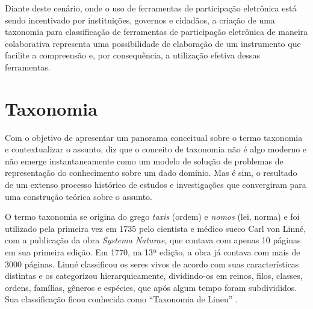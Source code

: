 \par
Diante deste cenário, onde o uso de ferramentas de participação eletrônica está sendo incentivado por instituições, governos e cidadãos, a criação de uma taxonomia para 
classificação de ferramentas de participação eletrônica de maneira colaborativa representa uma possibilidade de elaboração de um instrumento que facilite a compreensão e, 
por consequência, a utilização efetiva dessas ferramentas. 


\section{Taxonomia}
\label{sec:taxonomia}
Com o objetivo de apresentar um panorama conceitual sobre o termo taxonomia e contextualizar o assunto,  diz que o conceito de taxonomia
não é algo moderno e não emerge instantaneamente como um modelo de solução de problemas de representação do conhecimento sobre um dado domínio. Mas é sim,
o resultado de um extenso processo histórico de estudos e investigações que convergiram para uma construção teórica sobre o assunto. 

\par
O termo taxonomia se origina do grego \textit{taxis} (ordem) e \textit{nomos} (lei, norma) e foi utilizado pela primeira vez em 1735 pelo cientista e médico sueco Carl von Linné,
com a publicação da obra \textit{Systema Naturae}, que contava com apenas 10 páginas em sua primeira edição. Em 1770, na 13ª edição, a obra já contava com mais de 3000 páginas.
Linné classificou os seres vivos de acordo com suas características distintas e os categorizou hierarquicamente, dividindo-os em reinos, filos, classes, ordens, famílias, 
gêneros e espécies, que após algum tempo foram subdivididos. Sua classificação ficou conhecida como “Taxonomia de Lineu” \cite{polaszek2010systema}.

